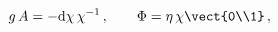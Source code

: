 \begin{equation}
g\, A = -  {\rm d}\chi \, \chi^{-1}\,, \qquad
\Phi  = \eta\, \chi \vect{0\\1}\,,
\end{equation}


